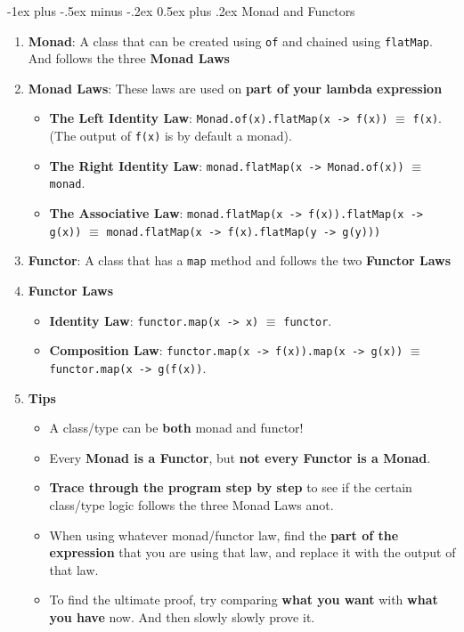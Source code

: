 \documentclass[10pt, landscape]{article}
\makeatletter
\renewcommand{\section}{\@startsection{section}{1}{0mm}%
                                {-1ex plus -.5ex minus -.2ex}%
                                {0.5ex plus .2ex}%
                                {\normalfont\large\bfseries}}
\makeatother
\begin{document}
\begin{multicols}{4}
\section{Monad and Functors}
\begin{enumerate}
    \item \textbf{Monad}: A class that can be created using \texttt{of} and chained using \texttt{flatMap}. And follows the three \textbf{Monad Laws}
    \item \textbf{Monad Laws}: These laws are used on \textbf{part of your lambda expression}
    \begin{itemize}
        \item \textbf{The Left Identity Law}: \texttt{Monad.of(x).flatMap(x -> f(x))} $\equiv$ \texttt{f(x)}. (The output of \texttt{f(x)} is by default a monad).
        \item \textbf{The Right Identity Law}: \texttt{monad.flatMap(x -> Monad.of(x))} $\equiv$ \texttt{monad}.
        \item \textbf{The Associative Law}: \texttt{monad.flatMap(x -> f(x)).flatMap(x -> g(x))} $\equiv$ \texttt{monad.flatMap(x -> f(x).flatMap(y -> g(y)))}
    \end{itemize}
    \item \textbf{Functor}: A class that has a \texttt{map} method and follows the two \textbf{Functor Laws}
    \item \textbf{Functor Laws}
    \begin{itemize}
        \item \textbf{Identity Law}: \texttt{functor.map(x -> x)} $\equiv$ \texttt{functor}.
        \item \textbf{Composition Law}: \texttt{functor.map(x -> f(x)).map(x -> g(x))} $\equiv$ \texttt{functor.map(x -> g(f(x))}.
    \end{itemize}
    \item \textbf{Tips}
    \begin{itemize}
        \item A class/type can be \textbf{both} monad and functor!
        \item Every \textbf{Monad is a Functor}, but \textbf{not every Functor is a Monad}.
        \item \textbf{Trace through the program step by step} to see if the certain class/type logic follows the three Monad Laws anot.\
        \item When using whatever monad/functor law, find the \textbf{part of the expression} that you are using that law, and replace it with the output of that law.
        \item To find the ultimate proof, try comparing \textbf{what you want} with \textbf{what you have} now. And then slowly slowly prove it.
    \end{itemize}
\end{enumerate}


\end{multicols}
\end{document}
